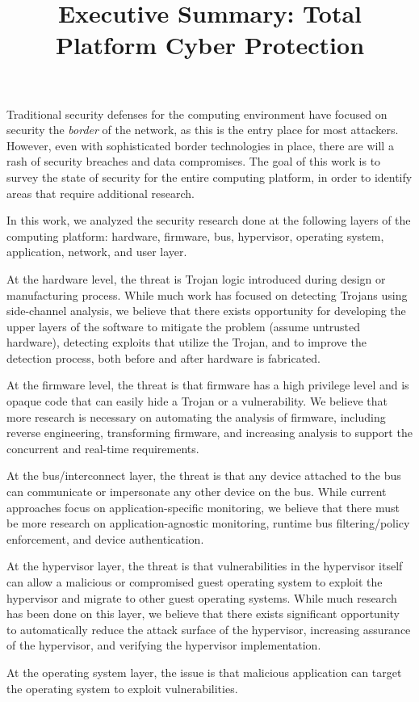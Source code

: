 \documentclass[11pt]{article}
\begin{document}
\title{Executive Summary: Total Platform Cyber Protection}
\date{}

\maketitle

Traditional security defenses for the computing environment have
focused on security the \emph{border} of the network, as this is the
entry place for most attackers. However, even with sophisticated
border technologies in place, there are will a rash of security
breaches and data compromises. The goal of this work is to survey the
state of security for the entire computing platform, in order to
identify areas that require additional research.

In this work, we analyzed the security research done at the following
layers of the computing platform: hardware, firmware, bus, hypervisor,
operating system, application, network, and user layer.

At the hardware level, the threat is Trojan logic introduced during
design or manufacturing process. While much work has focused on
detecting Trojans using side-channel analysis, we believe that there
exists opportunity for developing the upper layers of the software to
mitigate the problem (assume untrusted hardware), detecting exploits
that utilize the Trojan, and to improve the detection process, both
before and after hardware is fabricated.

At the firmware level, the threat is that firmware has a high
privilege level and is opaque code that can easily hide a Trojan or a
vulnerability. We believe that more research is necessary on
automating the analysis of firmware, including reverse engineering,
transforming firmware, and increasing analysis to support the
concurrent and real-time requirements.

At the bus/interconnect layer, the threat is that any device attached
to the bus can communicate or impersonate any other device on the bus.
While current approaches focus on application-specific monitoring, we
believe that there must be more research on application-agnostic
monitoring, runtime bus filtering/policy enforcement, and device
authentication.

At the hypervisor layer, the threat is that vulnerabilities in the
hypervisor itself can allow a malicious or compromised guest operating
system to exploit the hypervisor and migrate to other guest operating
systems. While much research has been done on this layer, we believe
that there exists significant opportunity to automatically reduce the
attack surface of the hypervisor, increasing assurance of the
hypervisor, and verifying the hypervisor implementation.

At the operating system layer, the issue is that malicious application
can target the operating system to exploit vulnerabilities.
\end{document}
